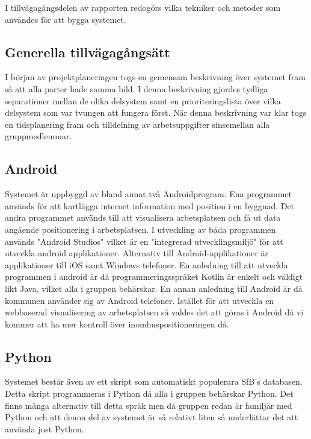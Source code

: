 \documentclass[swedish, a4paper,12pt]{article}
\begin{document}

I tillvägagångsdelen av rapporten redogörs vilka tekniker och metoder som användes för att bygga systemet.

\subsection{Generella tillvägagångsätt}
I början av projektplaneringen togs en gemensam beskrivning över systemet fram så att alla parter hade samma bild. I denna beskrivning gjordes tydliga separationer mellan de olika delsystem samt en prioriteringslista över vilka delsystem som var tvungen att fungera först. När denna beskrivning var klar togs en tidsplanering fram och tilldelning av arbetsuppgifter sinsemellan alla gruppmedlemmar.

\subsection{Android}
Systemet är uppbyggd av bland annat två Androidprogram. Ena programmet används för att kartlägga internet information med position i en byggnad. Det andra programmet används till att visualisera arbetsplatsen och få ut data angående positionering i arbetsplatsen. I utveckling av båda programmen används "Android Studios" vilket är en "integrerad utvecklingsmiljö" för att utveckla android applikationer. Alternativ till Android-applikationer är applikationer till iOS samt Windows telefoner. En anledning till att utveckla programmen i android är då programmeringsspråket Kotlin är enkelt och väldigt likt Java, vilket alla i gruppen behärskar. En annan anledning till Android är då kommunen använder sig av Android telefoner. Istället för att utveckla en webbaserad visualisering av arbetsplatsen så valdes det att göras i Android då vi kommer att ha mer kontroll över inomhuspositioneringen då.

\subsection{Python}
Systemet består även av ett skript som automatiskt populerara SfB's databasen. Detta skript programmeras i Python då alla i gruppen behärskar Python. Det finns många alternativ till detta språk men då gruppen redan är familjär med Python och att denna del av systemet är så relativt liten så underlättar det att använda just Python.
\end{document}
